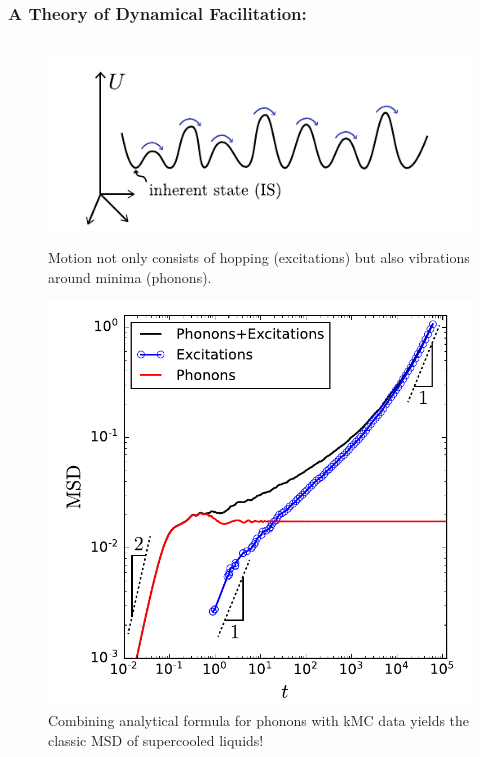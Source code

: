 \begin{frame}\label{d.6}
\frametitle{A Theory of Dynamical Facilitation: }

\begin{columns}[T]
\begin{column}[T]{0.5\textwidth}
\begin{figure}
\begin{overprint}
\vspace{20pt}\centering\includegraphics[width=\linewidth]{d.6-fac_results_3/pes.pdf}
\caption{Motion not only consists of hopping (excitations) but also vibrations around minima (phonons).}

\centering\includegraphics[valign=c,width=0.9\linewidth]{d.6-fac_results_3/newmsdphonons0.pdf}
\caption{Combining analytical formula for phonons with kMC data yields the classic MSD of supercooled liquids!}



\end{overprint}
\end{figure}
\end{column}
\end{columns}
\end{frame}
